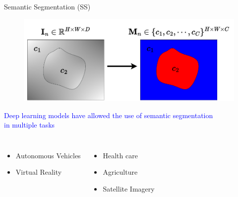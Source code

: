 \documentclass[aspectratio=169]{beamer}
\let\oldcite\cite %
\renewcommand{\cite}[1]{{\tiny\oldcite{#1}}}
\begin{document}
\begin{frame}{Semantic Segmentation (SS)}
    

\begin{figure}
    \centering
    \includegraphics[width=0.58\linewidth]{Figures/segmentaitonDef.pdf}
    \label{fig:enter-label}
\end{figure}

\begin{centering}
    \textcolor{blue}{Deep learning models have allowed the use of semantic segmentation \\ in multiple tasks} \cite{electronics11121884}

\end{centering}

\begin{columns}




\begin{itemize}

    \item Autonomous Vehicles \cite{cakir2022semantic, s23020895, technologies10040090, Burel2022ImprovingDF}
    \item Virtual Reality \cite{9319081, 10.1145/2992138.2992144}
    

\end{itemize}


\begin{itemize}
    \item Health care  \cite{QURESHI2023316, WOS:000673109800001,9804867}
    \item Agriculture \cite{LUO2023, 9395478}
    \item Satellite Imagery \cite{lilay2023semantic, WIELAND2023113452}
\end{itemize}



\end{columns}

\end{frame}
\end{document}

